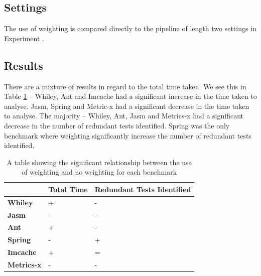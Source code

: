 \documentclass[11pt
              , a4paper
              , twoside
              , openright
              ]{report}
\newcommand{\rom}[1]{\uppercase\expandafter{\romannumeral #1\relax}}
\begin{document}
\subsection{Settings}
The use of weighting is compared directly to the pipeline of length two settings in Experiment \rom{1}.


\subsection{Results}
There are a mixture of results in regard to the total time taken. We see this in Table \ref{weightingsig} -- Whiley, Ant and Imcache had a significant increase in the time taken to analyse. Jasm, Spring and Metric-x had a significant decrease in the time taken to analyse. The majority -- Whiley, Ant, Jasm and Metrics-x had a significant decrease in the number of redundant tests identified. Spring was the only benchmark where weighting significantly increase the number of redundant tests identified.

\begin{table}[h]
\centering


\begin{tabular}{|l|l|l|}
\hline
{\bf }          & {\bf Total Time} & {\bf Redundant Tests Identified} \\ \hline
{\bf Whiley}    & +                & -                           \\ \hline
{\bf Jasm}      & -                & -                           \\ \hline
{\bf Ant}       & +                & -                           \\ \hline
{\bf Spring}    & -                & +                           \\ \hline
{\bf Imcache}   & +                & =                           \\ \hline
{\bf Metrics-x} & -                & -                           \\ \hline
\end{tabular}
\caption{A table showing the significant relationship between the use of weighting and no weighting for each benchmark}
\label{weightingsig}
\end{table}
\end{document}
